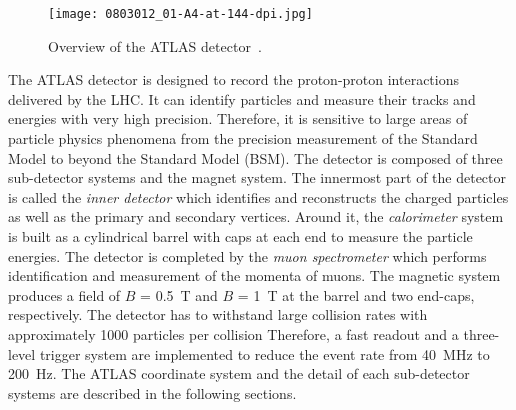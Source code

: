 \begin{figure}[htbp]
    \begin{center}
        \texttt{[image: 0803012\_01-A4-at-144-dpi.jpg]}
        \caption{Overview of the ATLAS detector~\cite{Aad:2008zzm}.}
        \label{fig:ae_ATLAS_detector}
    \end{center}
\end{figure}

The ATLAS detector is designed to record the proton-proton interactions delivered by the LHC.
It can identify particles and measure their tracks and energies with very high precision.
Therefore, it is sensitive to large areas of particle physics phenomena from the precision measurement of the  Standard Model to beyond the Standard Model (BSM).
The detector is composed of three sub-detector systems and the magnet system.
The innermost part of the detector is called the \textit{inner detector} which identifies and reconstructs the charged particles as well as the primary and secondary vertices.
Around it, the \textit{calorimeter} system is built as a cylindrical barrel with caps at each end to measure the particle energies.
The detector is completed by the \textit{muon spectrometer} which performs identification and measurement of the momenta of muons.
The magnetic system produces a field of $B$ = 0.5~T and $B$ = 1~T at the barrel and two end-caps, respectively.
The detector has to withstand large collision rates with approximately 1000 particles per collision
Therefore, a fast readout and a three-level trigger system are implemented to reduce the event rate from 40~MHz to 200~Hz.
The ATLAS coordinate system and the detail of each sub-detector systems are described in the following sections.


